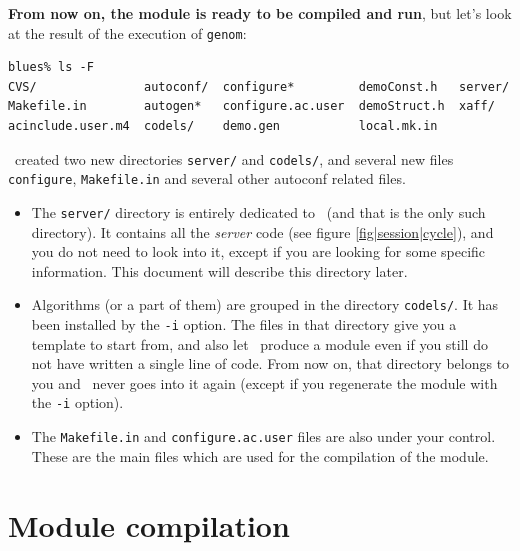 \textbf{From now on, the module is ready to  be compiled and run}, but let's
look at the result of the execution of \texttt{genom}:

\begin{center}
\begin{cartouche}\small
\begin{verbatim}
blues% ls -F
CVS/               autoconf/  configure*         demoConst.h   server/
Makefile.in        autogen*   configure.ac.user  demoStruct.h  xaff/
acinclude.user.m4  codels/    demo.gen           local.mk.in
\end{verbatim}
\end{cartouche}
\end{center}

\bigbreak
\GenoM\ created two new directories \texttt{server/} and \texttt{codels/}, and 
several
new files \texttt{configure}, \texttt{Makefile.in} and several other
autoconf related files. 

\begin{itemize}
   \item The \texttt{server/} directory  is entirely dedicated to \GenoM\ (and
   that is the only  such directory).  It contains  all the  \emph{server}
   code (see figure \ref{fig|session|cycle}), and you do not need to look
   into it, except if you are looking for some specific information. This
   document will describe this directory later.

   \item Algorithms (or a part of them) are grouped in the directory 
\texttt{codels/}. It has been  installed by the  \texttt{-i} option. The files in
   that directory give you a template to start from, and also let \GenoM\
   produce a module even if you still do not have written a single line of
   code. From now  on,  that directory belongs to  you  and \GenoM\ never
   goes into it again (except if you regenerate  the module with the 
\texttt{-i} option).

   \item The  \texttt{Makefile.in} and \texttt{configure.ac.user} files
are  also under your control. These are the
   main files which are used for the compilation of the module.

\end{itemize}


\section{Module compilation}
\label{sec|session|compile}

